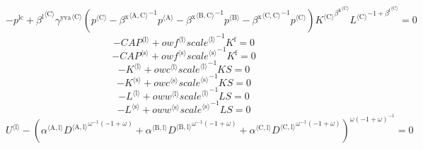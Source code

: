 \begin{equation}
-p^{\mathrm{lc}} + {{\beta^{\mathrm{l}}}^{\langle \mathrm{\mathrm{C}}\rangle}} {{\gamma^{\mathrm{yva}}}^{\langle \mathrm{\mathrm{C}}\rangle}} \left({p}^{\langle \mathrm{C}\rangle} - {{\beta^{\mathrm{x}}}^{\langle \mathrm{\mathrm{A}},\mathrm{\mathrm{C}}\rangle}}^{-1} {{p}^{\langle \mathrm{A}\rangle}} - {{\beta^{\mathrm{x}}}^{\langle \mathrm{\mathrm{B}},\mathrm{\mathrm{C}}\rangle}}^{-1} {{p}^{\langle \mathrm{B}\rangle}} - {{\beta^{\mathrm{x}}}^{\langle \mathrm{\mathrm{C}},\mathrm{\mathrm{C}}\rangle}}^{-1} {{p}^{\langle \mathrm{C}\rangle}}\right) {{{K}^{\langle \mathrm{C}\rangle}}^{{\beta^{\mathrm{k}}}^{\langle \mathrm{\mathrm{C}}\rangle}}} {{{L}^{\langle \mathrm{C}\rangle}}^{-1 + {\beta^{\mathrm{l}}}^{\langle \mathrm{\mathrm{C}}\rangle}}} = 0
\end{equation}
\begin{equation}
-{{C\!A\!P}}^{\langle \mathrm{l}\rangle} + {{{o\!w\!f}}^{\langle \mathrm{\mathrm{l}}\rangle}} {{{s\!c\!a\!l\!e}}^{\langle \mathrm{\mathrm{l}}\rangle}}^{-1} {K^{\mathrm{f}}} = 0
\end{equation}
\begin{equation}
-{{C\!A\!P}}^{\langle \mathrm{s}\rangle} + {{{o\!w\!f}}^{\langle \mathrm{\mathrm{s}}\rangle}} {{{s\!c\!a\!l\!e}}^{\langle \mathrm{\mathrm{s}}\rangle}}^{-1} {K^{\mathrm{f}}} = 0
\end{equation}
\begin{equation}
-{K}^{\langle \mathrm{l}\rangle} + {{{o\!w\!c}}^{\langle \mathrm{\mathrm{l}}\rangle}} {{{s\!c\!a\!l\!e}}^{\langle \mathrm{\mathrm{l}}\rangle}}^{-1} {{K\!S}} = 0
\end{equation}
\begin{equation}
-{K}^{\langle \mathrm{s}\rangle} + {{{o\!w\!c}}^{\langle \mathrm{\mathrm{s}}\rangle}} {{{s\!c\!a\!l\!e}}^{\langle \mathrm{\mathrm{s}}\rangle}}^{-1} {{K\!S}} = 0
\end{equation}
\begin{equation}
-{L}^{\langle \mathrm{l}\rangle} + {{{o\!w\!w}}^{\langle \mathrm{\mathrm{l}}\rangle}} {{{s\!c\!a\!l\!e}}^{\langle \mathrm{\mathrm{l}}\rangle}}^{-1} {{L\!S}} = 0
\end{equation}
\begin{equation}
-{L}^{\langle \mathrm{s}\rangle} + {{{o\!w\!w}}^{\langle \mathrm{\mathrm{s}}\rangle}} {{{s\!c\!a\!l\!e}}^{\langle \mathrm{\mathrm{s}}\rangle}}^{-1} {{L\!S}} = 0
\end{equation}
\begin{equation}
{U}^{\langle \mathrm{l}\rangle} - \left({{\alpha}^{\langle \mathrm{\mathrm{A}},\mathrm{\mathrm{l}}\rangle}} {{{D}^{\langle \mathrm{A},\mathrm{l}\rangle}}^{{\omega}^{-1} \left(-1 + \omega\right)}} + {{\alpha}^{\langle \mathrm{\mathrm{B}},\mathrm{\mathrm{l}}\rangle}} {{{D}^{\langle \mathrm{B},\mathrm{l}\rangle}}^{{\omega}^{-1} \left(-1 + \omega\right)}} + {{\alpha}^{\langle \mathrm{\mathrm{C}},\mathrm{\mathrm{l}}\rangle}} {{{D}^{\langle \mathrm{C},\mathrm{l}\rangle}}^{{\omega}^{-1} \left(-1 + \omega\right)}}\right)^{{\omega} \left(-1 + \omega\right)^{-1}} = 0
\end{equation}
